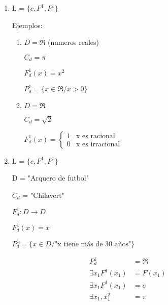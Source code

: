 \begin{example}

\begin{enumerate}
\item L = $\{c, F^1, P^1 \}$

	Ejemplos:
	\begin{enumerate}
	\item $D = \Re$ (numeros reales)
	
	$C_d = \pi$
	
	$F^{1}_{d}(x) = x^2$
	
	$P^{1}_{d} = \{ x \in \Re / x > 0\}$
	\item $D = \Re$
	
	$C_d = \sqrt{2}$
	
	$F^{1}_{d}(x) =
		\begin{cases}	
			1 &\text{x es racional} \\
			0 &\text{x es irracional}
		\end{cases}$		
	\end{enumerate}

\item L = $\{c, F^1, P^1 \}$

	D = "Arquero de futbol"
	
	$C_d$ = "Chilavert"
	
	$F^{1}_{d}: D \to D$
	
	$F^{1}_{d}(x) = x$
	
	$P^{1}_{d} = \{ x \in D / \text{"x tiene m\'as de 30 años"}\}$
\end{enumerate}

\begin{align*}
	P^{1}_{d} &= \Re \\
	\exists x_1 F^{1}(x_1) &= F(x_1) 	\\
	\exists x_1 F^{1}(x_1) &= c			\\
	\exists x_1, x_{1}^{2} &= \pi		\\
\end{align*}

\end{example}

